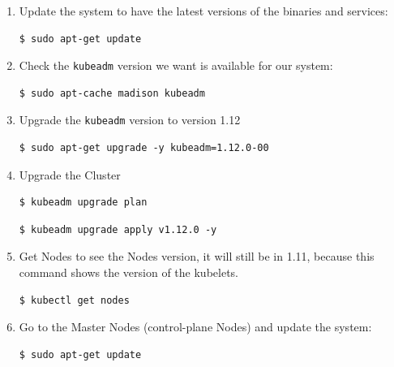 \documentclass{article}
\newenvironment{codetemplate}[1][]{%
  \mybasecolorbox[#1]
  \itshape
}{%
  \endmybasecolorbox
}
\begin{document}
\begin{enumerate}

    \item Update the system to have the latest versions of the binaries and services:
\begin{codetemplate}{}
\begin{verbatim}
$ sudo apt-get update
\end{verbatim}
\end{codetemplate}

    \item Check the \verb|kubeadm| version we want is available for our system:
\begin{codetemplate}{}
\begin{verbatim}
$ sudo apt-cache madison kubeadm
\end{verbatim}
\end{codetemplate}

    \item Upgrade the \verb|kubeadm| version to version 1.12
\begin{codetemplate}{}
\begin{verbatim}
$ sudo apt-get upgrade -y kubeadm=1.12.0-00
\end{verbatim}
\end{codetemplate}

    \item Upgrade the Cluster
\begin{codetemplate}{}
\begin{verbatim}
$ kubeadm upgrade plan
\end{verbatim}
\end{codetemplate}
\begin{codetemplate}{}
\begin{verbatim}
$ kubeadm upgrade apply v1.12.0 -y
\end{verbatim}
\end{codetemplate}

    \item Get Nodes to see the Nodes version, it will still be in 1.11, because this command shows the version of the kubelets.
\begin{codetemplate}{}
\begin{verbatim}
$ kubectl get nodes
\end{verbatim}
\end{codetemplate}

    \item Go to the Master Nodes (control-plane Nodes) and update the system:
\begin{codetemplate}{}
\begin{verbatim}
$ sudo apt-get update
\end{verbatim}
\end{codetemplate}


\end{enumerate}
\end{document}
